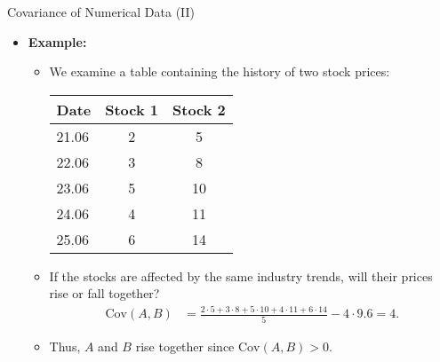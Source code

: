 \begin{frame}{Covariance of Numerical Data (II)}
	\begin{itemize}
		\item \textbf{Example:}
		      \begin{itemize}
			      \item We examine a table containing the history of two
			            stock prices:

			            \begin{center}
				            \begin{tabular}{|l|c|c|}
					            \hline
					            Date  & Stock 1 & Stock 2
					            \\\hline
					            21.06 & 2       & 5
					            \\\hline
					            22.06 & 3       & 8
					            \\\hline
					            23.06 & 5       & 10
					            \\\hline
					            24.06 & 4       & 11
					            \\\hline
					            25.06 & 6       & 14
					            \\\hline
				            \end{tabular}
			            \end{center}

			            \vspace{1mm}

			      \item If the stocks are affected by the same industry trends,
			            will their prices rise or fall together?
			            \begin{align*}
				            \text{Cov}(A, B) & = \frac{2\cdot5 + 3\cdot 8 + 5
					            \cdot
					            10 + 4 \cdot 11 + 6 \cdot 14}{5} - 4\cdot 9.6 = 4.
			            \end{align*}
			      \item Thus, $A$ and $B$ rise together since $\text{Cov}(A, B) >
				            0$.
		      \end{itemize}
	\end{itemize}
\end{frame}
